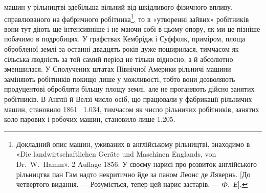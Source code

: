 \parcont{}  %
машин у рільництві здебільша вільний від шкідливого фізичного
впливу, справлюваного на фабричного робітника\footnote{
Докладний опис машин, уживаних в англійському рільництві,
знаходимо в «\textgerman{Die landwirtschaftlichen Geräte und Maschinen Englands,
von Dr.~W.~Hamm}». 2 Auflage 1856. У своєму нарисі про розвиток англійського
рільництва пан Гам надто некритично йде за паном Леонс де
Лявернь. [До четвертого видання. — Розуміється, тепер цей нарис застарів.
— \emph{Ф.~Е}].
},
то в «утворенні зайвих» робітників вони тут діють ще інтенсивніше
і не маючи собі в цьому опору, як ми це пізніше
побачимо в подробицях. У графствах Кембрідж і Суффолк, приміром,
площа обробленої землі за останні двадцять років дуже
поширилася, тимчасом як сільська людність за той самий період
не тільки відносно, а й абсолютно зменшилася. У Сполучених
штатах Північної Америки рільничі машини заміняють робітників
покищо лише у можливості, тобто вони дозволяють продуцентові
обробляти більшу площу землі, але не проганяють дійсно
занятих робітників. В Англії й Велзі число осіб, що працювали
у фабрикації рільничих машин, становило 1861~ \num{1.034}, тимчасом
як число рільничих робітників, занятих коло парових і робочих
машин, становило лише \num{1.205}.

